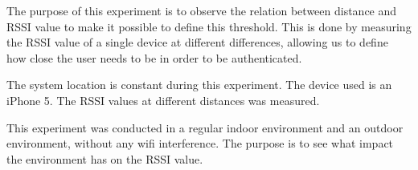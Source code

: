 The purpose of this experiment is to observe the relation between distance and RSSI value to make it possible to  define  this threshold. This is done by measuring the RSSI value of a single device at different differences, allowing us to define how close the user needs to be in order to be authenticated. 

The system location is constant during this experiment. The device used is an iPhone 5. The RSSI values at different distances was measured. 

This experiment was conducted in a regular indoor environment and an outdoor environment, without any wifi interference. The purpose is to see what impact the environment has on the RSSI value.


